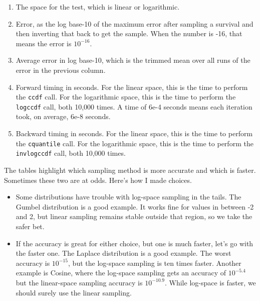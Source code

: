 \documentclass{article}
\begin{document}
\begin{enumerate}
	\item The space for the test, which is linear or logarithmic.

	\item Error, as the log base-10 of the maximum error after sampling a survival and then inverting that back to get the sample. When the number is -16, that means the error is $10^{-16}$.

	\item Average error in log base-10, which is the trimmed mean over all runs of the error in the previous column.

	\item Forward timing in seconds. For the linear space, this is the time to perform the \texttt{ccdf} call. For the logarithmic space, this is the time to perform the \texttt{logccdf} call, both 10,000 times. A time of 6e-4 seconds means each iteration took, on average, 6e-8 seconds.

	\item Backward timing in seconds. For the linear space, this is the time to perform the \texttt{cquantile} call. For the logarithmic space, this is the time to perform the \texttt{invlogccdf} call, both 10,000 times.
\end{enumerate}

\pagebreak


\pagebreak


\pagebreak


The tables highlight which sampling method is more accurate and which is faster. Sometimes these two are at odds. Here's how I made choices.

\begin{itemize}
	\item Some distributions have trouble with log-space sampling in the tails. The Gumbel distribution is a good example. It works fine for values in between -2 and 2, but linear sampling remains stable outside that region, so we take the safer bet.

	\item If the accuracy is great for either choice, but one is much faster, let's go with the faster one. The Laplace distribution is a good example. The worst accuracy is $10^{-15}$, but the log-space sampling is ten times faster. Another example is Cosine, where the log-space sampling gets an accuracy of $10^{-5.4}$ but the linear-space sampling accuracy is $10^{-10.9}$. While log-space is faster, we should surely use the linear sampling.
\end{itemize}
\end{document}
